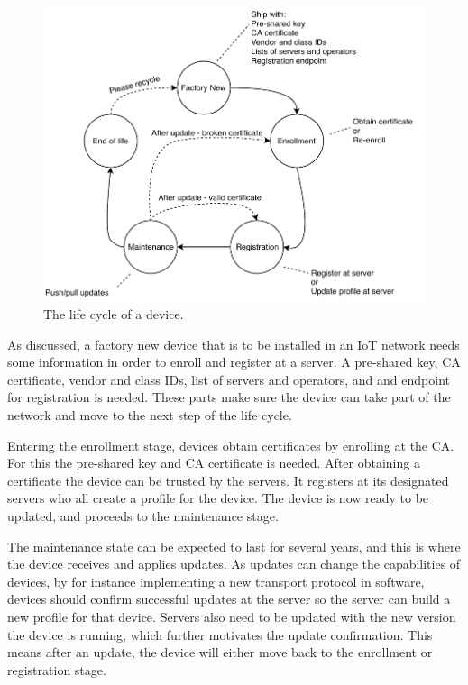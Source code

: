 \documentclass[0-thesis.tex]{subfiles}
\begin{document}
\begin{figure}
    \caption{The life cycle of a device.}
    \label{fig:lifecycle}
    \includegraphics{images/lifecycle.pdf}
\end{figure}


As discussed, a factory new device that is to be installed in an IoT network needs some
information in order to enroll and register at a server. A pre-shared key, CA certificate,
vendor and class IDs, list of servers and operators, and and endpoint for registration is
needed. These parts make sure the device can take part of the network and move to the next
step of the life cycle. 

Entering the enrollment stage, devices obtain certificates by enrolling at the CA. For
this the pre-shared key and CA certificate is needed. After obtaining a certificate the
device can be trusted by the servers. It registers at its designated servers who all
create a profile for the device. The device is now ready to be updated, and proceeds to
the maintenance stage.

The maintenance state can be expected to last for several years, and this is where the
device receives and applies updates. As updates can change the capabilities of devices, by
for instance implementing a new transport protocol in software, devices should confirm
successful updates at the server so the server can build a new profile for that device.
Servers also need to be updated with the new version the device is running, which further
motivates the update confirmation. This means after an update, the device will either move
back to the enrollment or registration stage.
\end{document}
